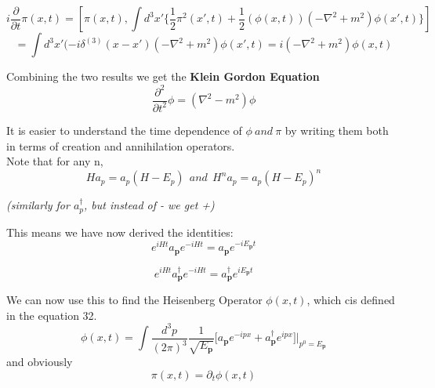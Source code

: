 \documentclass{article}
\newcommand{\A}{a^\dagger}
\begin{document}
\begin{equation}
    i\frac{\partial}{\partial t}\pi(x,t) =[\pi(x,t),\int d^3x' \{ \frac{1}{2} \pi^2(x',t) + \frac{1}{2}(\phi(x,t))(-\nabla^2 +m^2)\phi(x',t)\}]
\end{equation}
\begin{equation*}
    = \int d^3x'(-i\delta^{(3)}(x-x')(-\nabla^2 +m^2)\phi(x',t)=i(-\nabla^2 +m^2)\phi(x,t)
\end{equation*}

Combining the two results we get the \textbf{Klein Gordon Equation}
\begin{equation}
    \frac{\partial^2}{\partial t^2}\phi = (\nabla^2 - m^2)\phi
\end{equation}


It is easier to understand the time dependence of $\phi\ and\ \pi$ by writing them both in terms of creation and annihilation operators.
\\

Note that for any n,
\begin{equation*}
    Ha_p = a_p(H-E_p)\ \ and\  \ H^n a_p = a_p(H-E_p)^n
\end{equation*}

\textit{(similarly for $\A_p$, but instead of - we get +)}

This means we have now derived the identities:
$$e^{iHt}a_{\textbf{p}}e^{-iHt} = a_{\textbf{p}}e^{-iE_{\textbf{p}}t}$$

$$e^{iHt}a^{\dagger}_{\textbf{p}}e^{-iHt} = a^{\dagger}_{\textbf{p}}e^{iE_{\textbf{p}}t}$$

We can now use this to find the Heisenberg Operator $\phi(x,t)$, which cis defined in the equation 32.
\\

\begin{equation}
    \phi(x,t) = \int \frac{d^3p}{(2\pi)^3} \frac{1}{\sqrt{E_{\textbf{p}}}} \big[a_{\textbf{p}}e^{-ipx} + a^{\dagger}_{\textbf{p}}e^{ipx}  \big] \Big\vert_{p^0 = E_{\textbf{p}}}
\end{equation}
and obviously
\begin{equation}
    \pi(x,t) = \partial_t \phi(x,t)
\end{equation}
\end{document}
